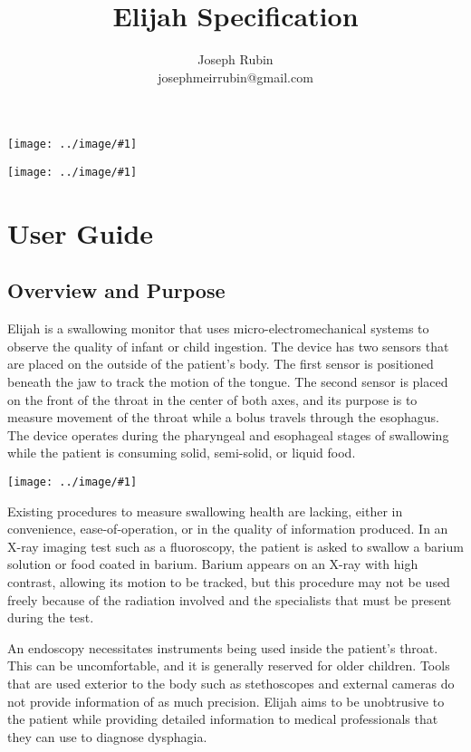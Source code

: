 \documentclass{article}
\title{Elijah Specification}
\author{Joseph Rubin\\josephmeirrubin@gmail.com}
\newcommand{\img}[2]{
    \begin{center}
        \texttt{[image: ../image/\#1]}
    \end{center}    
}
\begin{document}
    \maketitle
    \img{sixdof_logo}{0.261}
    \vspace{0.1cm}
    \img{lit_a}{0.1372}
    \newpage
    
    \tableofcontents
    \newpage
    
    \section{User Guide}
        \subsection{Overview and Purpose}
        Elijah is a swallowing monitor that uses micro-electromechanical systems to observe the quality of infant or child ingestion. The device has two sensors that are placed on the outside of the patient's body. The first sensor is positioned beneath the jaw to track the motion of the tongue. The second sensor is placed on the front of the throat in the center of both axes, and its purpose is to measure movement of the throat while a bolus travels through the esophagus. The device operates during the pharyngeal and esophageal stages of swallowing while the patient is consuming solid, semi-solid, or liquid food.
        
        \img{mems}{0.089}
        \vspace{8pt}
        Existing procedures to measure swallowing health are lacking, either in convenience, ease-of-operation, or in the quality of information produced. In an X-ray imaging test such as a fluoroscopy, the patient is asked to swallow a barium solution or food coated in barium. Barium appears on an X-ray with high contrast, allowing its motion to be tracked, but this procedure may not be used freely because of the radiation involved and the specialists that must be present during the test.
        
        An endoscopy necessitates instruments being used inside the patient's throat. This can be uncomfortable, and it is generally reserved for older children. Tools that are used exterior to the body such as stethoscopes and external cameras do not provide information of as much precision. Elijah aims to be unobtrusive to the patient while providing detailed information to medical professionals that they can use to diagnose dysphagia.
        
\end{document}
